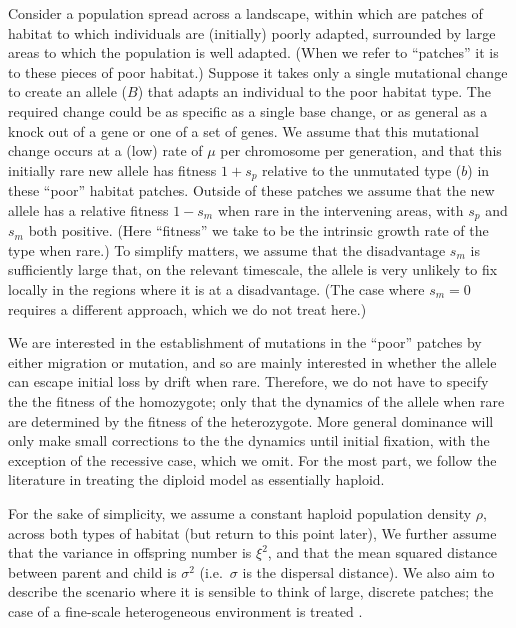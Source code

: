 \documentclass{article}
\begin{document}
Consider a population spread across a landscape, 
within which are patches of habitat to which individuals are (initially) poorly adapted,
surrounded by large areas to which the population is well adapted.
(When we refer to ``patches'' it is to these pieces of poor habitat.)
Suppose it takes only a single mutational change to create an allele
($B$) that adapts an individual to the poor habitat type.
The required change could be as specific as a single base change, 
or as general as a knock out of a gene or one of a set of genes.
We assume that this mutational change occurs at a (low) rate of $\mu$ per chromosome per generation,
and that this initially rare new allele has fitness $1+s_p$ relative to the unmutated type ($b$) in these ``poor'' habitat patches.
Outside of these patches we assume that the new allele has a relative fitness
$1-s_m$  when rare in the intervening areas, with $s_p$ and $s_m$ both positive.
(Here ``fitness'' we take to be the intrinsic growth rate of the type when rare.)
To simplify matters, we assume that the disadvantage $s_m$ 
is sufficiently large that, on the relevant timescale,
the allele is very unlikely to fix locally in the regions where it is at a disadvantage.
(The case where $s_m=0$ requires a different approach, which we do not treat here.)

We are interested in the establishment of mutations in the ``poor'' patches by either
migration or mutation, and so are mainly interested in whether the allele
can escape initial loss by drift when rare. 
Therefore, we do not have to specify the the fitness of the homozygote; 
only that the dynamics of the allele when rare 
are determined by the fitness of the heterozygote. 
More general dominance will only make small corrections to the the dynamics until initial fixation,
with the exception of the recessive case, which we omit.
For the most part, 
we follow the literature in treating the diploid model as essentially haploid.

For the sake of simplicity, we assume a constant haploid population density $\rho$, 
across both types of habitat (but return to this point later),
We further assume that the variance in offspring number is $\xi^2$, 
and that the mean squared distance between parent and child is $\sigma^2$
(i.e.\ $\sigma$ is the dispersal distance).
We also aim to describe the scenario where it is sensible to think of large, discrete patches;
the case of a fine-scale heterogeneous environment is treated \citep{elsewhere}.
\end{document}

